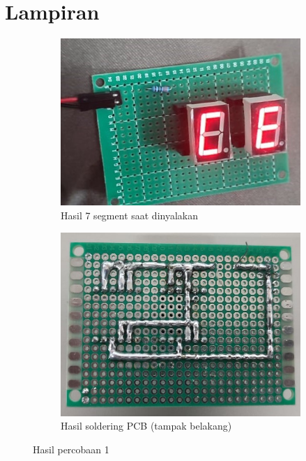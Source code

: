 \section*{Lampiran} %


\begin{figure}[H]
  \centering
  \begin{subfigure}[c]{0.4\linewidth}
    \centering
    \includegraphics[width=\linewidth]{img/modul_2/percobaan1_hasil.jpg}
    \caption{Hasil 7 segment saat dinyalakan\label{fig:inisub1}}
  \end{subfigure}
  \hspace{1cm}
  \begin{subfigure}[c]{0.4\linewidth}
    \centering
    \includegraphics[width=\linewidth]{img/modul_2/percobaan1_hasil_solder.jpg}
    \caption{Hasil soldering PCB (tampak belakang) \label{fig:inisub2}}
  \end{subfigure}
  \caption{Hasil percobaan 1 \label{fig:keduagambar}}
\end{figure}

